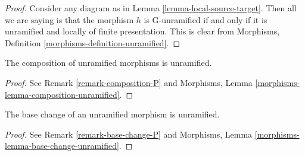 \begin{proof}
Consider any diagram as in
Lemma \ref{lemma-local-source-target}.
Then all we are saying is that the morphism $h$ is
G-unramified if and only if it is unramified and locally of finite
presentation. This is clear from
Morphisms, Definition \ref{morphisms-definition-unramified}.
\end{proof}

\begin{lemma}
\label{lemma-composition-unramified}
The composition of unramified morphisms is unramified.
\end{lemma}

\begin{proof}
See Remark \ref{remark-composition-P} and
Morphisms, Lemma \ref{morphisms-lemma-composition-unramified}.
\end{proof}

\begin{lemma}
\label{lemma-base-change-unramified}
The base change of an unramified morphism is unramified.
\end{lemma}

\begin{proof}
See Remark \ref{remark-base-change-P} and
Morphisms, Lemma \ref{morphisms-lemma-base-change-unramified}.
\end{proof}

